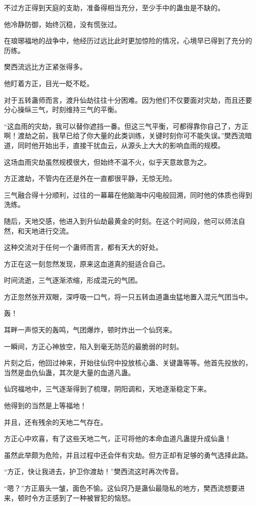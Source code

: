 \begin{this_body}
不过方正得到天庭的支助，准备得相当充分，至少手中的蛊虫是不缺的。

他冷静防御，始终沉稳，没有慌张过。

在琅琊福地的战争中，他经历过远比此时更加惊险的情况，心境早已得到了充分的历练。

樊西流远比方正紧张得多。

他盯着方正，目光一眨不眨。

对于五转蛊师而言，渡升仙劫往往十分困难。因为他们不仅要面对灾劫，而且还要分心操纵三气，时刻维持三气的平衡。

“这血雨的灾劫，我可以替你遮挡一番。但这三气平衡，可都得靠你自己了，方正啊！渡劫之前，我早已给了你大量的此类训练，关键时刻你可不能失误。”樊西流暗道，同时他开始出手，直接干扰血云，从源头上大大的影响血雨的规模。

这场血雨灾劫虽然规模很大，但始终不温不火，似乎天意故意为之。

方正渡劫，不管内在还是外在一直都很平静，无惊无险。

三气融合得十分顺利，过往的一幕幕在他脑海中闪电般回溯，同时他的体质也得到洗练。

随后，天地交感，他进入到升仙劫最黄金的时刻。在这个时间段，他可以师法自然，和天地进行交流。

这种交流对于任何一个蛊师而言，都有天大的好处。

方正在这一刻忽然发现，原来这血道真的挺适合自己。

时间流逝，三气逐渐浓缩，形成混元的气团。

方正忽然张开双眼，深呼吸一口气，将一只五转血道蛊虫猛地置入混元气团当中。

轰！

耳畔一声惊天的轰鸣，气团爆炸，顿时炸出一个仙窍来。

一瞬间，方正心神放空，陷入到毫无防范的最脆弱的时刻。

片刻之后，他回过神来，开始往仙窍中投放核心蛊、关键蛊等等。他首先投放的，当然是血仇仙蛊，其次是大量的血道凡蛊。

仙窍福地中，三气逐渐得到了梳理，阴阳调和，天地逐渐稳定下来。

他得到的当然是上等福地！

并且，还有残余的天地二气存在。

方正心中欢喜，有了这些天地二气，正可将他的本命血道凡蛊提升成仙蛊！

虽然此举颇为危险，并且过程中还会伴有灾劫。但方正却有足够的勇气选择此路。

“方正，快让我进去，护卫你渡劫！”樊西流这时再次传音。

“嗯？”方正眉头一皱，面色不愉。这仙窍乃是蛊仙最隐私的地方，樊西流想要进来，顿时令方正感到了一种被冒犯的恼怒。


\end{this_body}
